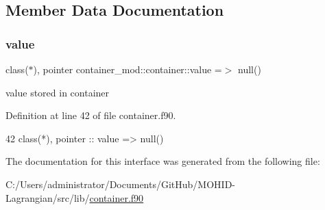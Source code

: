 \subsection{Member Data Documentation}
\mbox{\label{structcontainer__mod_1_1container_a297f4632156bf226aa8599a7f0cd55c0}} 
\subsubsection{\texorpdfstring{value}{value}}
{\footnotesize\ttfamily class($\ast$), pointer container\+\_\+mod\+::container\+::value =$>$ null()\hspace{0.3cm}{\ttfamily [private]}}



value stored in container 



Definition at line 42 of file container.\+f90.


\begin{DoxyCode}
42         \textcolor{keywordtype}{class}(*), \textcolor{keywordtype}{pointer} :: \textcolor{keywordtype}{value} => null() 
\end{DoxyCode}


The documentation for this interface was generated from the following file\+:\begin{DoxyCompactItemize}
\item 
C\+:/\+Users/administrator/\+Documents/\+Git\+Hub/\+M\+O\+H\+I\+D-\/\+Lagrangian/src/lib/\mbox{\hyperlink{container_8f90}{container.\+f90}}\end{DoxyCompactItemize}
